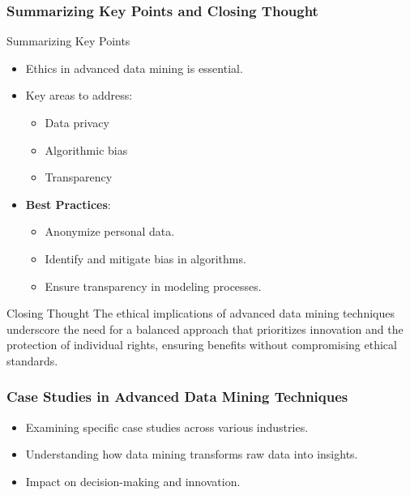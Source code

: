 \documentclass{beamer}
\begin{document}
\begin{frame}[fragile]
    \frametitle{Summarizing Key Points and Closing Thought}
    
    \begin{block}{Summarizing Key Points}
        \begin{itemize}
            \item Ethics in advanced data mining is essential.
            \item Key areas to address:
            \begin{itemize}
                \item Data privacy
                \item Algorithmic bias
                \item Transparency
            \end{itemize}
            \item \textbf{Best Practices}:
            \begin{itemize}
                \item Anonymize personal data.
                \item Identify and mitigate bias in algorithms.
                \item Ensure transparency in modeling processes.
            \end{itemize}
        \end{itemize}
    \end{block}
    
    \begin{block}{Closing Thought}
        The ethical implications of advanced data mining techniques underscore the need for a balanced approach that prioritizes innovation and the protection of individual rights, ensuring benefits without compromising ethical standards.
    \end{block}
\end{frame}

\begin{frame}[fragile]
    \frametitle{Case Studies in Advanced Data Mining Techniques}
    \begin{itemize}
        \item Examining specific case studies across various industries.
        \item Understanding how data mining transforms raw data into insights.
        \item Impact on decision-making and innovation.
    \end{itemize}
\end{frame}
\end{document}
